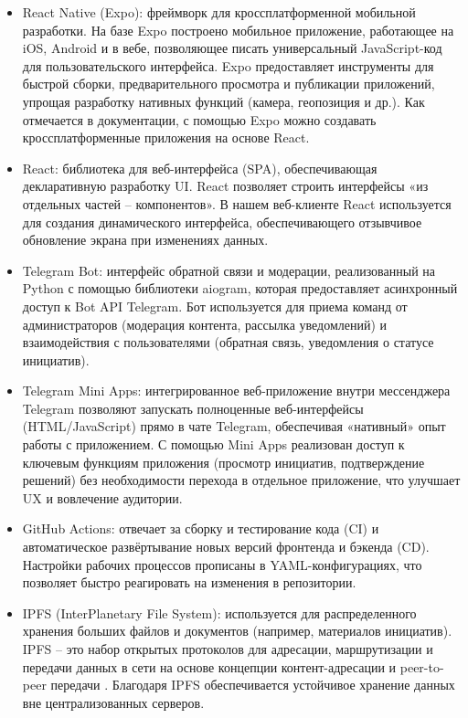 \documentclass[
    14pt,
    specialist,
    candidate, %
    subf, %
    href,
    dotsinheaders=false
]{disser}
\begin{document}
\begin{itemize}
  \item React Native (Expo): фреймворк для кроссплатформенной мобильной разработки. На базе Expo построено мобильное приложение, работающее на iOS, Android и в вебе, позволяющее писать универсальный JavaScript-код для пользовательского интерфейса. Expo предоставляет инструменты для быстрой сборки, предварительного просмотра и публикации приложений, упрощая разработку нативных функций (камера, геопозиция и др.). Как отмечается в документации, с помощью Expo можно создавать кроссплатформенные приложения на основе React. \cite{docs_expo_2025}

  \item React: библиотека для веб-интерфейса (SPA), обеспечивающая декларативную разработку UI. React позволяет строить интерфейсы «из отдельных частей – компонентов». В нашем веб-клиенте React используется для создания динамического интерфейса, обеспечивающего отзывчивое обновление экрана при изменениях данных. \cite{docs_react_2025}

  \item Telegram Bot: интерфейс обратной связи и модерации, реализованный на Python с помощью библиотеки aiogram, которая предоставляет асинхронный доступ к Bot API Telegram. Бот используется для приема команд от администраторов (модерация контента, рассылка уведомлений) и взаимодействия с пользователями (обратная связь, уведомления о статусе инициатив). \cite{aiogram_docs_2025}

  \item Telegram Mini Apps: интегрированное веб-приложение внутри мессенджера Telegram позволяют запускать полноценные веб-интерфейсы (HTML/JavaScript) прямо в чате Telegram, обеспечивая «нативный» опыт работы с приложением. С помощью Mini Apps реализован доступ к ключевым функциям приложения (просмотр инициатив, подтверждение решений) без необходимости перехода в отдельное приложение, что улучшает UX и вовлечение аудитории. \cite{docs_telegram_mini_apps_2025}

  \item GitHub Actions: отвечает за сборку и тестирование кода (CI) и автоматическое развёртывание новых версий фронтенда и бэкенда (CD). Настройки рабочих процессов прописаны в YAML-конфигурациях, что позволяет быстро реагировать на изменения в репозитории. \cite{docs_github_actions_2025}

  \item IPFS (InterPlanetary File System): используется для распределенного хранения больших файлов и документов (например, материалов инициатив). IPFS – это набор открытых протоколов для адресации, маршрутизации и передачи данных в сети на основе концепции контент-адресации и peer-to-peer передачи \cite{docs_ipfs_2025}. Благодаря IPFS обеспечивается устойчивое хранение данных вне централизованных серверов.


\end{itemize}
\end{document}
